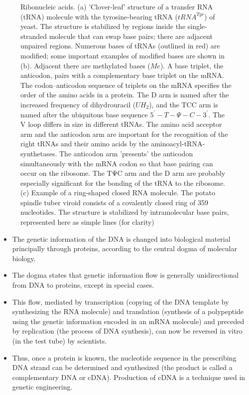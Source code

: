 \documentclass[11pt,ignorenonframetext,aspectratio=169]{beamer}
\providecommand{\tightlist}{%
  \setlength{\itemsep}{0pt}\setlength{\parskip}{0pt}}
\begin{document}
\begin{frame}{}
\begin{figure}
\begin{columns}[T,onlytextwidth]
  \caption{\newline Ribonucleic acids. (a) 'Clover-leaf' structure of a transfer RNA (tRNA) molecule with the tyrosine-bearing tRNA ($tRNA^{Tyr}$) of yeast. The structure is stabilized by regions inside the single-stranded molecule that can swap base pairs; there are adjacent unpaired regions. Numerous bases of tRNAs (outlined in red) are modified; some important examples of modified bases are shown in (b). Adjacent there are methylated bases ($Me$). A base triplet, the anticodon, pairs with a complementary base triplet on the mRNA. The codon–anticodon sequence of triplets on the mRNA specifies the order of the amino acids in a protein. The D arm is named after the increased frequency of dihydrouracil ($UH_2$), and the TCC arm is named after the ubiquitous base sequence $5^{\prime} - T - \Psi - C - 3^{\prime}$. The V loop differs in size in different tRNAs. The amino acid acceptor arm and the anticodon arm are important for the recognition of the right tRNAs and their amino acids by the aminoacyl-tRNA-synthetases. The anticodon arm 'presents' the anticodon simultaneously with the mRNA codon so that base pairing can occur on the ribosome. The $\mathrm{T\Psi C}$ arm and the D arm are probably especially significant for the bonding of the tRNA to the ribosome. (c) Example of a ring-shaped closed RNA molecule. The potato spindle tuber viroid consists of a covalently closed ring of 359 nucleotides. The structure is stabilized by intramolecular base pairs, represented here as simple lines (for clarity)}
  \label{fig:ribonucleic-acids}

  \end{columns}
\end{figure}
\end{frame}

\begin{frame}{}
\protect\hypertarget{section-13}{}
\begin{itemize}
\tightlist
\item
  The genetic information of the DNA is changed into biological material
  principally through proteins, according to the central dogma of
  molecular biology.
\item
  The dogma states that genetic information flow is generally
  unidirectional from DNA to proteins, except in special cases.
\item
  This flow, mediated by transcription (copying of the DNA template by
  synthesizing the RNA molecule) and translation (synthesis of a
  polypeptide using the genetic information encoded in an mRNA molecule)
  and preceded by replication (the process of DNA synthesis), can now be
  reversed in vitro (in the test tube) by scientists.
\item
  Thus, once a protein is known, the nucleotide sequence in the
  prescribing DNA strand can be determined and synthesized (the product
  is called a complementary DNA or cDNA). Production of cDNA is a
  technique used in genetic engineering.
\end{itemize}
\end{frame}
\end{document}
